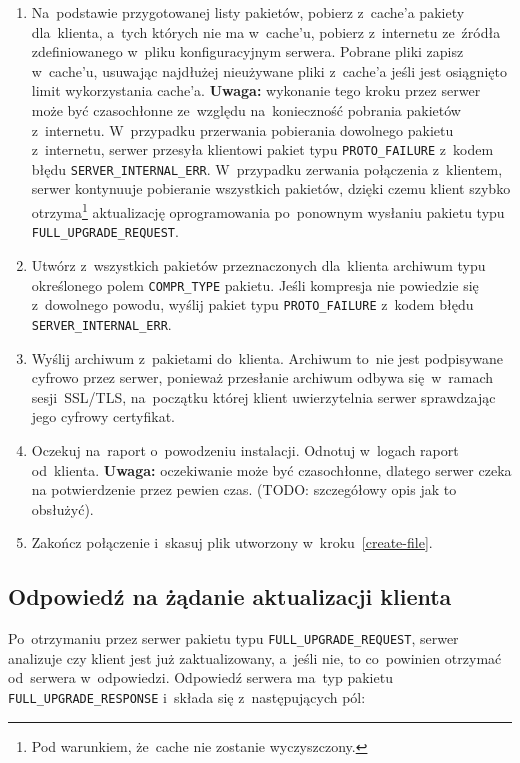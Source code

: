 \documentclass[thesis]{subfiles}
\begin{document}
\begin{enumerate}
	\item Na~podstawie przygotowanej listy pakietów, pobierz z~cache'a pakiety dla~klienta, a~tych których nie ma w~cache'u, pobierz z~internetu ze~źródła zdefiniowanego w~pliku konfiguracyjnym serwera. Pobrane pliki zapisz w~cache'u, usuwając najdłużej nieużywane pliki z~cache'a jeśli jest osiągnięto limit wykorzystania cache'a. \textbf{Uwaga:} wykonanie tego kroku przez serwer może być czasochłonne ze~względu na~konieczność pobrania pakietów z~internetu. W~przypadku przerwania pobierania dowolnego pakietu z~internetu, serwer przesyła klientowi pakiet typu \texttt{PROTO\_FAILURE} z~kodem błędu \texttt{SERVER\_INTERNAL\_ERR}. W~przypadku zerwania połączenia z~klientem, serwer kontynuuje pobieranie wszystkich pakietów, dzięki czemu klient szybko otrzyma\footnote{Pod warunkiem, że~cache nie zostanie wyczyszczony.} aktualizację oprogramowania po~ponownym wysłaniu pakietu typu \texttt{FULL\_UPGRADE\_REQUEST}.
	\item Utwórz z~wszystkich pakietów przeznaczonych dla~klienta archiwum typu określonego polem \texttt{COMPR\_TYPE} pakietu. Jeśli kompresja nie powiedzie się z~dowolnego powodu, wyślij pakiet typu \texttt{PROTO\_FAILURE} z~kodem błędu \texttt{SERVER\_INTERNAL\_ERR}.
	\item Wyślij archiwum z~pakietami do~klienta. Archiwum to~nie jest podpisywane cyfrowo przez serwer, ponieważ przesłanie archiwum odbywa się~w~ramach sesji~SSL/TLS, na~początku której klient uwierzytelnia serwer sprawdzając jego cyfrowy certyfikat.
	\item Oczekuj na~raport o~powodzeniu instalacji. Odnotuj w~logach raport od~klienta. \textbf{Uwaga:} oczekiwanie może być czasochłonne, dlatego serwer czeka na potwierdzenie przez pewien czas. (TODO: szczegółowy opis jak to obsłużyć).
	\item Zakończ połączenie i~skasuj plik utworzony w~kroku~\ref{create-file}.
\end{enumerate}


\subsection{Odpowiedź na żądanie aktualizacji klienta}
\label{full-upgrade-response}

Po~otrzymaniu przez serwer pakietu typu \texttt{FULL\_UPGRADE\_REQUEST}, serwer analizuje czy klient jest już zaktualizowany, a~jeśli nie, to co~powinien otrzymać od~serwera w~odpowiedzi. Odpowiedź serwera ma~typ pakietu \texttt{FULL\_UPGRADE\_RESPONSE} i~składa się z~następujących pól:
\end{document}
